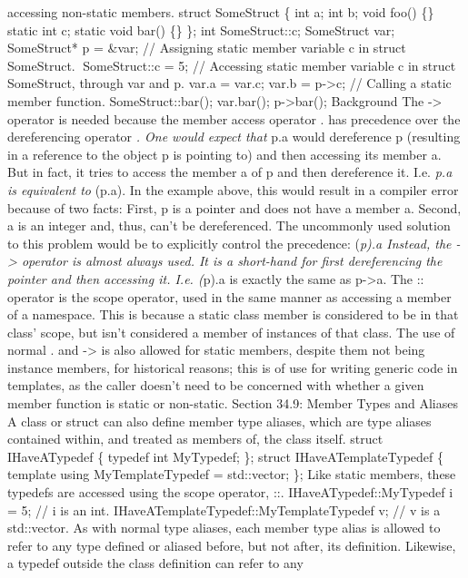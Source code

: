 accessing non-static members. struct SomeStruct \{ int a; int b; void
foo() \{\} static int c; static void bar() \{\} \}; int SomeStruct::c;
SomeStruct var; SomeStruct* p = \&var; // Assigning static member
variable c in struct SomeStruct. SomeStruct::c = 5; // Accessing static
member variable c in struct SomeStruct, through var and p. var.a =
var.c; var.b = p-\textgreater c; // Calling a static member function.
SomeStruct::bar(); var.bar(); p-\textgreater bar(); Background The
-\textgreater{} operator is needed because the member access operator .
has precedence over the dereferencing operator \emph{. One would expect
that }p.a would dereference p (resulting in a reference to the object p
is pointing to) and then accessing its member a. But in fact, it tries
to access the member a of p and then dereference it. I.e. \emph{p.a is
equivalent to }(p.a). In the example above, this would result in a
compiler error because of two facts: First, p is a pointer and does not
have a member a. Second, a is an integer and, thus, can't be
dereferenced. The uncommonly used solution to this problem would be to
explicitly control the precedence: (\emph{p).a Instead, the
-\textgreater{} operator is almost always used. It is a short-hand for
ﬁrst dereferencing the pointer and then accessing it. I.e. (}p).a is
exactly the same as p-\textgreater a. The :: operator is the scope
operator, used in the same manner as accessing a member of a namespace.
This is because a static class member is considered to be in that class'
scope, but isn't considered a member of instances of that class. The use
of normal . and -\textgreater{} is also allowed for static members,
despite them not being instance members, for historical reasons; this is
of use for writing generic code in templates, as the caller doesn't need
to be concerned with whether a given member function is static or
non-static. Section 34.9: Member Types and Aliases A class or struct can
also deﬁne member type aliases, which are type aliases contained within,
and treated as members of, the class itself. struct IHaveATypedef \{
typedef int MyTypedef; \}; struct IHaveATemplateTypedef \{ template
using MyTemplateTypedef = std::vector; \}; Like static members, these
typedefs are accessed using the scope operator, ::.
IHaveATypedef::MyTypedef i = 5; // i is an int.
IHaveATemplateTypedef::MyTemplateTypedef v; // v is a std::vector. As
with normal type aliases, each member type alias is allowed to refer to
any type deﬁned or aliased before, but not after, its deﬁnition.
Likewise, a typedef outside the class deﬁnition can refer to any
